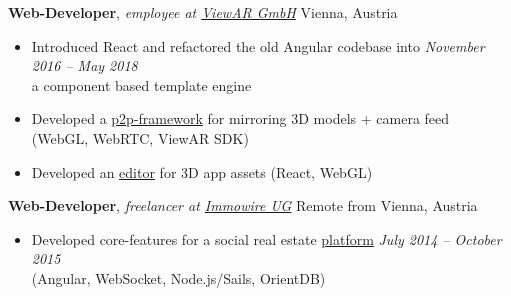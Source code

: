 \documentclass[9pt]{extarticle}
\begin{document}
\noindent
{\bf Web-Developer}, \textit{employee at \href{https://viewar.com}{ViewAR GmbH}}  \hfill Vienna, Austria
\begin{itemize}
\setlength\itemsep{0.05em}
    \item Introduced React and refactored the old Angular codebase into \hfill \textit{November 2016 -- May 2018} \\
    a component based template engine
    \item Developed a \href{https://www.youtube.com/watch?v=0j-v-j9xEUQ}{p2p-framework} for mirroring 3D models + camera feed \\
    (WebGL, WebRTC, ViewAR SDK)
    \item Developed an \href{https://www.youtube.com/watch?v=quE-erJ4PmU&t=113s}{editor} for 3D app assets (React, WebGL) \\
\end{itemize}

\noindent
{\bf Web-Developer}, \textit{freelancer at \href{https://youtu.be/cs-IyI_erZo?t=16}{Immowire UG}}  \hfill Remote from Vienna, Austria
\begin{itemize}
    \setlength\itemsep{0.05em}
\item Developed core-features for a social real estate  \href{https://youtu.be/cs-IyI_erZo?t=16}{platform} \hfill \textit{July 2014 -- October 2015} \\ 
(Angular, WebSocket, Node.js/Sails, OrientDB)\\
\end{itemize}

\end{document}
